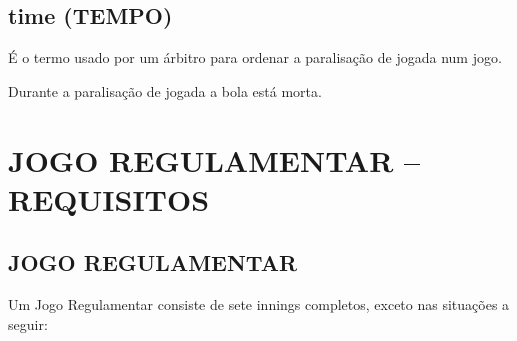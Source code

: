 \subsection{\Gls{time} (TEMPO)}
É o termo usado por um árbitro para ordenar a paralisação de jogada num jogo.

Durante a paralisação de jogada a bola está morta.

\section{JOGO REGULAMENTAR -- REQUISITOS}
\subsection{JOGO REGULAMENTAR}
Um Jogo Regulamentar consiste de sete \glspl{inning} completos, exceto nas situações a seguir:
